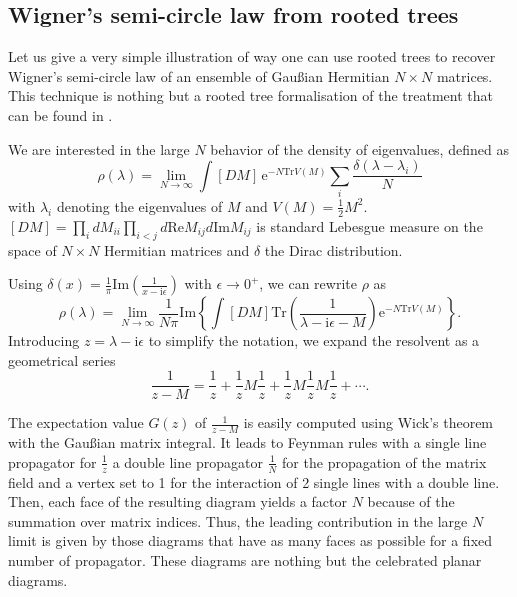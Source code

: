 \documentclass[10pt,here,feynmf]{article}
\begin{document}
\subsection{Wigner's semi-circle law from rooted trees}

Let us give a very simple illustration of way one can use rooted trees to recover Wigner's semi-circle law of an ensemble of Gau\ss ian Hermitian $N\times N$ matrices. This technique is nothing but  a rooted tree formalisation of the treatment that can be found in \cite{zee}. 

We are interested in the large $N$ behavior of the density of eigenvalues, defined as
\begin{equation}
\rho(\lambda)=\lim_{N\rightarrow\infty}\int [DM]\,\mathrm{e}^{-N\mathrm{Tr}V(M)}
\sum_{i}\frac{\delta(\lambda-\lambda_{i})}{N}
\end{equation}
with $\lambda_{i}$ denoting the eigenvalues of $M$ and $V(M)=\frac{1}{2}M^{2}$. $[DM]=\prod_{i}dM_{ii}\prod_{i<j}d\mathrm{Re}M_{ij}d\mathrm{Im}M_{ij}$ is standard Lebesgue measure on the space of $N\times N$ Hermitian matrices and $\delta$ the Dirac distribution.

Using $\delta(x)=\frac{1}{\pi}\mathrm{Im}\left(\frac{1}{x-\mathrm{i}\epsilon}\right)$ with $\epsilon\rightarrow 0^{+}$, we can rewrite $\rho$ as
\begin{equation}
\rho(\lambda)=\lim_{N\rightarrow\infty}\frac{1}{N\pi}\mathrm{Im}\left\{
\int [DM]\mathrm{Tr}\left(\frac{1}{\lambda-\mathrm{i}\epsilon-M}
\right)
\mathrm{e}^{-N\mathrm{Tr}V(M)}\right\}.
\end{equation}
Introducing $z=\lambda-\mathrm{i}\epsilon$ to simplify the notation, we expand the resolvent as a geometrical series 
\begin{equation} 
\frac{1}{z-M}=\frac{1}{z}+\frac{1}{z}M\frac{1}{z}+\frac{1}{z}M\frac{1}{z}M\frac{1}{z}+\cdots.
\end{equation}


The expectation value $G(z)$ of  $\frac{1}{z-M}$ is easily computed using Wick's theorem with the Gau\ss ian matrix integral. It leads to Feynman rules with a single line propagator for $\frac{1}{z}$ a double line propagator $\frac{1}{N}$ for the propagation of the matrix field and a vertex set to 1 for the interaction of 2 single lines with a double line. Then, each face of the resulting diagram yields a factor $N$ because of the summation over matrix indices. Thus, the leading contribution in the large $N$ limit is given by those diagrams that have as many faces as possible for a fixed number of propagator. These diagrams are nothing but the celebrated planar diagrams.
\end{document}
